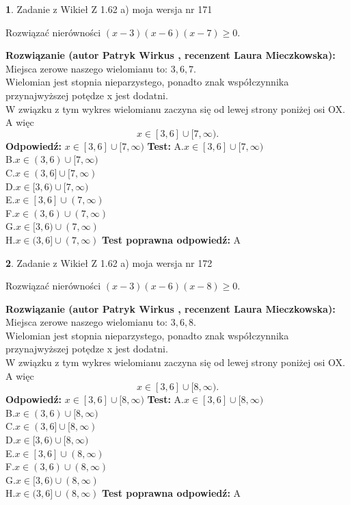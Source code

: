 \documentclass[12pt, a4paper]{article}
\theoremstyle{definition} %
\newtheorem{zad}{}
\newcommand{\zadStart}[1]{\begin{zad}#1\newline}
\newcommand{\zadStop}{\end{zad}}
\newcommand{\rozwStart}[2]{\noindent \textbf{Rozwiązanie (autor #1 , recenzent #2): }\newline}
\newcommand{\rozwStop}{\newline}
\newcommand{\odpStart}{\noindent \textbf{Odpowiedź:}\newline}
\newcommand{\odpStop}{\newline}
\newcommand{\testStart}{\noindent \textbf{Test:}\newline}
\newcommand{\testStop}{\newline}
\newcommand{\kluczStart}{\noindent \textbf{Test poprawna odpowiedź:}\newline}
\newcommand{\kluczStop}{\newline}
\begin{document}
\zadStart{Zadanie z Wikieł Z 1.62 a) moja wersja nr 171}

Rozwiązać nierówności $(x-3)(x-6)(x-7)\ge0$.
\zadStop
\rozwStart{Patryk Wirkus}{Laura Mieczkowska}
Miejsca zerowe naszego wielomianu to: $3, 6, 7$.\\
Wielomian jest stopnia nieparzystego, ponadto znak współczynnika przy\linebreak najwyższej potędze x jest dodatni.\\ W związku z tym wykres wielomianu zaczyna się od lewej strony poniżej osi OX. A więc $$x \in [3,6] \cup [7,\infty).$$
\rozwStop
\odpStart
$x \in [3,6] \cup [7,\infty)$
\odpStop
\testStart
A.$x \in [3,6] \cup [7,\infty)$\\
B.$x \in (3,6) \cup [7,\infty)$\\
C.$x \in (3,6] \cup [7,\infty)$\\
D.$x \in [3,6) \cup [7,\infty)$\\
E.$x \in [3,6] \cup (7,\infty)$\\
F.$x \in (3,6) \cup (7,\infty)$\\
G.$x \in [3,6) \cup (7,\infty)$\\
H.$x \in (3,6] \cup (7,\infty)$
\testStop
\kluczStart
A
\kluczStop



\zadStart{Zadanie z Wikieł Z 1.62 a) moja wersja nr 172}

Rozwiązać nierówności $(x-3)(x-6)(x-8)\ge0$.
\zadStop
\rozwStart{Patryk Wirkus}{Laura Mieczkowska}
Miejsca zerowe naszego wielomianu to: $3, 6, 8$.\\
Wielomian jest stopnia nieparzystego, ponadto znak współczynnika przy\linebreak najwyższej potędze x jest dodatni.\\ W związku z tym wykres wielomianu zaczyna się od lewej strony poniżej osi OX. A więc $$x \in [3,6] \cup [8,\infty).$$
\rozwStop
\odpStart
$x \in [3,6] \cup [8,\infty)$
\odpStop
\testStart
A.$x \in [3,6] \cup [8,\infty)$\\
B.$x \in (3,6) \cup [8,\infty)$\\
C.$x \in (3,6] \cup [8,\infty)$\\
D.$x \in [3,6) \cup [8,\infty)$\\
E.$x \in [3,6] \cup (8,\infty)$\\
F.$x \in (3,6) \cup (8,\infty)$\\
G.$x \in [3,6) \cup (8,\infty)$\\
H.$x \in (3,6] \cup (8,\infty)$
\testStop
\kluczStart
A
\kluczStop
\end{document}
